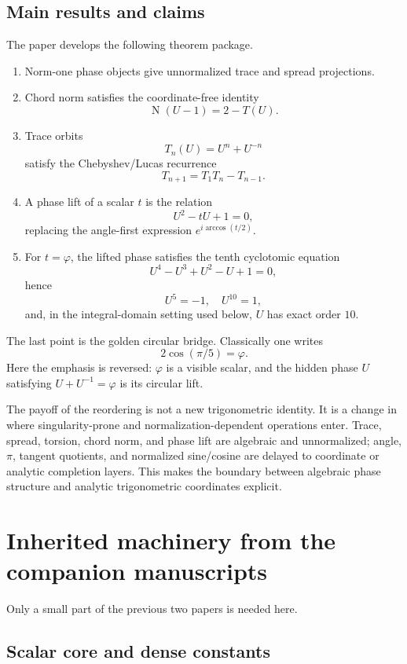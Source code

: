 \documentclass[11pt]{article}
\newcommand{\Nm}{\operatorname{N}}
\newcommand{\ph}{\varphi}
\begin{document}
\subsection*{Main results and claims}

The paper develops the following theorem package.
\begin{enumerate}[label=(\roman*)]
    \item Norm-one phase objects give unnormalized trace and spread projections.
    \item Chord norm satisfies the coordinate-free identity
    \[
        \Nm(U-1)=2-T(U).
    \]
    \item Trace orbits
    \[
        T_n(U)=U^n+U^{-n}
    \]
    satisfy the Chebyshev/Lucas recurrence
    \[
        T_{n+1}=T_1T_n-T_{n-1}.
    \]
    \item A phase lift of a scalar $t$ is the relation
    \[
        U^2-tU+1=0,
    \]
    replacing the angle-first expression $e^{i\arccos(t/2)}$.
    \item For $t=\ph$, the lifted phase satisfies the tenth cyclotomic equation
    \[
        U^4-U^3+U^2-U+1=0,
    \]
    hence
    \[
        U^5=-1,
        \quad U^{10}=1,
    \]
    and, in the integral-domain setting used below, $U$ has exact order $10$.
\end{enumerate}

The last point is the golden circular bridge.  Classically one writes
\[
    2\cos(\pi/5)=\ph.
\]
Here the emphasis is reversed: $\ph$ is a visible scalar, and the hidden phase $U$ satisfying $U+U^{-1}=\ph$ is its circular lift.

The payoff of the reordering is not a new trigonometric identity.  It is a change in where singularity-prone and normalization-dependent operations enter.  Trace, spread, torsion, chord norm, and phase lift are algebraic and unnormalized; angle, $\pi$, tangent quotients, and normalized sine/cosine are delayed to coordinate or analytic completion layers.  This makes the boundary between algebraic phase structure and analytic trigonometric coordinates explicit.

\section{Inherited machinery from the companion manuscripts}

Only a small part of the previous two papers is needed here.

\subsection{Scalar core and dense constants}
\end{document}
